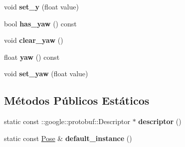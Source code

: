 \begin{DoxyCompactItemize}
\item 
void {\bfseries set\+\_\+y} (float value)\hypertarget{classvss__state_1_1Pose_a8f9ff5d89e9ce9cd1de1f3a707efc65f}{}\label{classvss__state_1_1Pose_a8f9ff5d89e9ce9cd1de1f3a707efc65f}

\item 
bool {\bfseries has\+\_\+yaw} () const \hypertarget{classvss__state_1_1Pose_ae9e89cd7eee237cfd7333449e3381cad}{}\label{classvss__state_1_1Pose_ae9e89cd7eee237cfd7333449e3381cad}

\item 
void {\bfseries clear\+\_\+yaw} ()\hypertarget{classvss__state_1_1Pose_adaf3f1567e367b89722e45b4bcc8bff6}{}\label{classvss__state_1_1Pose_adaf3f1567e367b89722e45b4bcc8bff6}

\item 
float {\bfseries yaw} () const \hypertarget{classvss__state_1_1Pose_a0b8e24e17a194af015f54ee616f583ab}{}\label{classvss__state_1_1Pose_a0b8e24e17a194af015f54ee616f583ab}

\item 
void {\bfseries set\+\_\+yaw} (float value)\hypertarget{classvss__state_1_1Pose_a7ec9dc6ed0302298048cd803e96b6ca3}{}\label{classvss__state_1_1Pose_a7ec9dc6ed0302298048cd803e96b6ca3}

\end{DoxyCompactItemize}
\subsection*{Métodos Públicos Estáticos}
\begin{DoxyCompactItemize}
\item 
static const \+::google\+::protobuf\+::\+Descriptor $\ast$ {\bfseries descriptor} ()\hypertarget{classvss__state_1_1Pose_a6423cf6dd9db285c52d1bb4e10e1a24c}{}\label{classvss__state_1_1Pose_a6423cf6dd9db285c52d1bb4e10e1a24c}

\item 
static const \hyperlink{classvss__state_1_1Pose}{Pose} \& {\bfseries default\+\_\+instance} ()\hypertarget{classvss__state_1_1Pose_a6d403e8d406ba3fd0403662cf8883fcc}{}\label{classvss__state_1_1Pose_a6d403e8d406ba3fd0403662cf8883fcc}

\end{DoxyCompactItemize}
